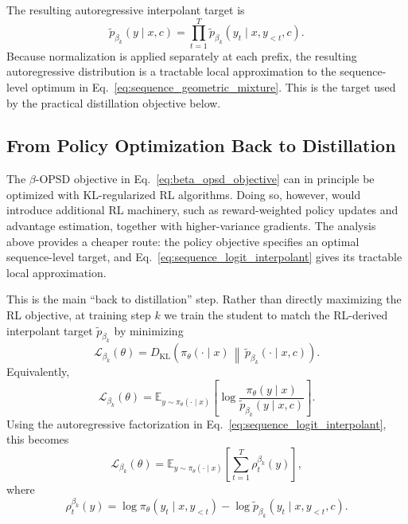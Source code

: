 The resulting autoregressive interpolant target is
\begin{equation}
    \tilde p_{\beta_k}(y\mid x,c)
    =
    \prod_{t=1}^{T}
    \tilde p_{\beta_k}(y_t\mid x,y_{<t},c).
    \label{eq:sequence_logit_interpolant}
\end{equation}
Because normalization is applied separately at each prefix, the resulting autoregressive
distribution is a tractable local approximation to the sequence-level optimum in
Eq.~\ref{eq:sequence_geometric_mixture}. This is the target used by the practical
distillation objective below.

\subsection{From Policy Optimization Back to Distillation}
\label{sec:logit_interpolant_distillation}

The $\beta$-OPSD objective in Eq.~\ref{eq:beta_opsd_objective} can in principle be
optimized with KL-regularized RL algorithms. Doing so, however, would introduce additional
RL machinery, such as reward-weighted policy updates and advantage estimation, together
with higher-variance gradients. The analysis above provides a cheaper route: the policy
objective specifies an optimal sequence-level target, and
Eq.~\ref{eq:sequence_logit_interpolant} gives its tractable local approximation.

This is the main ``back to distillation'' step. Rather than directly maximizing the RL
objective, at training step $k$ we train the student to match the RL-derived interpolant
target $\tilde p_{\beta_k}$ by minimizing
\begin{equation}
    \mathcal{L}_{\beta_k}(\theta)
    =
    D_{\mathrm{KL}}
    \left(
    \pi_\theta(\cdot\mid x)
    \,\middle\|\,
    \tilde p_{\beta_k}(\cdot\mid x,c)
    \right).
    \label{eq:interpolant_distillation_objective}
\end{equation}
Equivalently,
\begin{equation}
    \mathcal{L}_{\beta_k}(\theta)
    =
    \mathbb{E}_{y\sim\pi_\theta(\cdot\mid x)}
    \left[
    \log
    \frac{
    \pi_\theta(y\mid x)
    }{
    \tilde p_{\beta_k}(y\mid x,c)
    }
    \right].
\end{equation}
Using the autoregressive factorization in Eq.~\ref{eq:sequence_logit_interpolant}, this
becomes
\begin{equation}
    \mathcal{L}_{\beta_k}(\theta)
    =
    \mathbb{E}_{y\sim\pi_\theta(\cdot\mid x)}
    \left[
    \sum_{t=1}^{T}
    \rho_t^{\beta_k}(y)
    \right],
    \label{eq:interpolant_kl_decomposition}
\end{equation}
where
\begin{equation}
    \rho_t^{\beta_k}(y)
    =
    \log \pi_\theta(y_t\mid x,y_{<t})
    -
    \log \tilde p_{\beta_k}(y_t\mid x,y_{<t},c).
    \label{eq:interpolant_log_ratio}
\end{equation}

